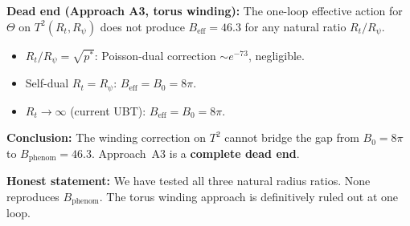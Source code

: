 \documentclass[12pt,a4paper]{article}
\theoremstyle{definition}
\theoremstyle{remark}
\begin{document}
\begin{deadendbox}
\textbf{Dead end (Approach A3, torus winding):}
The one-loop effective action for $\Theta$ on $T^2(R_t, R_\psi)$ does not
produce $B_{\mathrm{eff}} = 46.3$ for any natural ratio $R_t/R_\psi$.

\begin{itemize}
  \item $R_t/R_\psi = \sqrt{p^*}$: Poisson-dual correction $\sim e^{-73}$,
        negligible.
  \item Self-dual $R_t = R_\psi$: $B_{\mathrm{eff}} = B_0 = 8\pi$.
  \item $R_t \to \infty$ (current UBT): $B_{\mathrm{eff}} = B_0 = 8\pi$.
\end{itemize}

\textbf{Conclusion:} The winding correction on $T^2$ cannot bridge the
gap from $B_0 = 8\pi$ to $B_{\mathrm{phenom}} = 46.3$.
Approach~A3 is a \textbf{complete dead end}.

\textbf{Honest statement:} We have tested all three natural radius ratios.
None reproduces $B_{\mathrm{phenom}}$.  The torus winding approach is
definitively ruled out at one loop.
\end{deadendbox}

\ifdefined\INCLUDEMODE
\else
  
\end{document}
